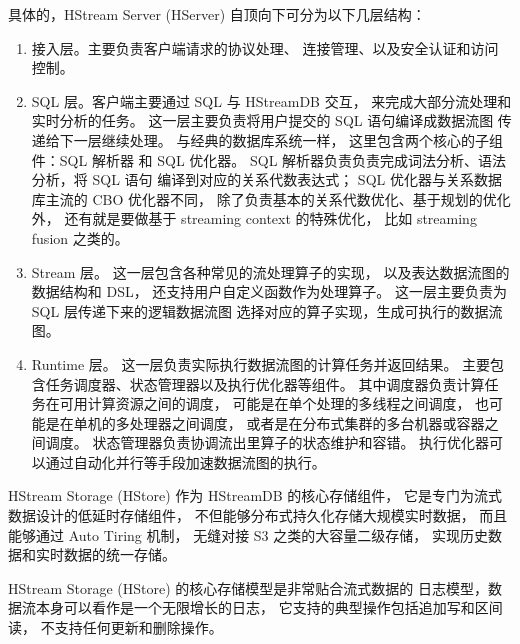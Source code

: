 \documentclass{ctexart}
\begin{document}
具体的，HStream Server (HServer) 自顶向下可分为以下几层结构：
\begin{enumerate}
    \item 接入层。主要负责客户端请求的协议处理、
    连接管理、以及安全认证和访问控制。
    \item SQL 层。客户端主要通过 SQL 与 HStreamDB 交互，
      来完成大部分流处理和实时分析的任务。
      这一层主要负责将用户提交的 SQL 语句编译成数据流图
      传递给下一层继续处理。
      与经典的数据库系统一样，
      这里包含两个核心的子组件：SQL 解析器 和 SQL 优化器。
      SQL 解析器负责负责完成词法分析、语法分析，将 SQL 语句
      编译到对应的关系代数表达式；
      SQL 优化器与关系数据库主流的 CBO 优化器不同，
      除了负责基本的关系代数优化、基于规划的优化外，
      还有就是要做基于 streaming context 的特殊优化，
      比如 streaming fusion 之类的。
    \item Stream 层。
      这一层包含各种常见的流处理算子的实现，
      以及表达数据流图的数据结构和 DSL，
      还支持用户自定义函数作为处理算子。
      这一层主要负责为 SQL 层传递下来的逻辑数据流图
      选择对应的算子实现，生成可执行的数据流图。
    \item Runtime 层。
      这一层负责实际执行数据流图的计算任务并返回结果。
      主要包含任务调度器、状态管理器以及执行优化器等组件。
      其中调度器负责计算任务在可用计算资源之间的调度，
      可能是在单个处理的多线程之间调度，
      也可能是在单机的多处理器之间调度，
      或者是在分布式集群的多台机器或容器之间调度。
      状态管理器负责协调流出里算子的状态维护和容错。
      执行优化器可以通过自动化并行等手段加速数据流图的执行。
\end{enumerate}

HStream Storage (HStore) 作为 HStreamDB 的核心存储组件，
它是专门为流式数据设计的低延时存储组件，
不但能够分布式持久化存储大规模实时数据，
而且能够通过 Auto Tiring 机制，
无缝对接 S3 之类的大容量二级存储，
实现历史数据和实时数据的统一存储。

HStream Storage (HStore) 的核心存储模型是非常贴合流式数据的
日志模型，数据流本身可以看作是一个无限增长的日志，
它支持的典型操作包括追加写和区间读，
不支持任何更新和删除操作。
\end{document}
